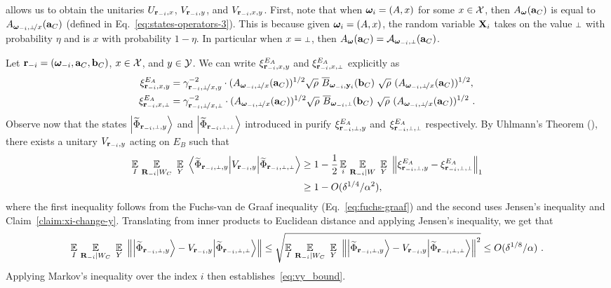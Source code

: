  allows us to obtain the unitaries $U_{\mathbf{r}_{-i},x}$, $V_{\mathbf{r}_{-i},y}$, and $V_{\mathbf{r}_{-i},x,y}$. First, note that when ${\boldsymbol{\omega}}_i = (A,x)$ for some $x \in \mathcal{X}$, then $A_{\boldsymbol{\omega}}(\mathbf{a}_C)$ is equal to $A_{\bomega_\mi,\dummyx}(\ba_C)$ (defined in Eq.~\eqref{eq:states-operators-3}). This is because given ${\boldsymbol{\omega}}_i = (A,x)$, the random variable $\mathbf{X}_i$ takes on the value $\dummy$ with probability $\eta$ and is $x$ with probability $1 - \eta$. In particular when $x = \dummy$, then $A_\bomega(\ba_C) = \A_{\bomega_\mi,\dummy}(\ba_C)$. 

Let $\mathbf{r}_{-i} = ({\boldsymbol{\omega}}_{-i},\mathbf{a}_C,\mathbf{b}_C)$, $x \in \mathcal{X}$, and $y \in \mathcal{Y}$. We can write $\xi^{E_A}_{\mathbf{r}_{-i} , x,y}$ and $\xi^{E_A}_\ssxp$ explicitly as
\begin{align*}
	\xi^{E_A}_\ssxy &= \gamma_\sspxy^{-2} \cdot (A_{\bomega_\mi,\dummyx}(\ba_C))^{1/2} \sqrt{\rho} \,\, \overline{B}_{\bomega_\mi,\by_i}(\bb_C) \,\, \sqrt{\rho}\,\, (A_{\bomega_\mi,\dummyx}(\ba_C))^{1/2},\\ 
	\xi^{E_A}_\ssxp &= \gamma_\sspxp^{-2} \cdot (A_{\bomega_\mi,\dummyx}(\ba_C))^{1/2} \sqrt{\rho} \,\, \overline{B}_{\bomega_\mi,\dummy}(\bb_C) \,\, \sqrt{\rho}\,\, (A_{\bomega_\mi,\dummyx}(\ba_C))^{1/2}~.
\end{align*}
Observe now that the states $\bigket{\wt{\Phi}_\sspy}$ and $\bigket{\wt{\Phi}_\sspp}$ introduced in  purify $\xi^{E_A}_\sspy$ and $\xi^{E_A}_\sspp$ respectively. By Uhlmann's Theorem (), there exists a unitary $V_{\mathbf{r}_{-i}, y}$ acting on $E_B$ such that 
\begin{align}
	\Ex_I \, \Ex_{\bR_\mi |  W_C} \, \, \Ex_{Y} \,\,  \bigbra{\wt{\Phi}_\sspy } V_{\br_\mi, y}  \bigket{\wt{\Phi}_\sspp}  
	& \geq 1 - \frac{1}{2} \Ex_i \, \Ex_{\bR_\mi |  W} \, \, \Ex_{Y}  \,\,  \Big \| \xi^{E_A}_\sspy - \xi^{E_A}_\sspp \Big \|_1 \notag \\
	& \geq 1 - O(\delta^{1/4}/\alpha^2),
\end{align}
where the first inequality follows from the Fuchs-van de Graaf inequality (Eq.~\eqref{eq:fuchs-graaf}) and the second uses Jensen's inequality and Claim~\ref{claim:xi-change-y}. Translating from inner products to Euclidean distance and applying Jensen's inequality, we get that
\[
	\Ex_I \, \Ex_{\bR_\mi |  W_C} \, \, \Ex_{Y} \,\,   \left \| \bigket{\wt{\Phi}_\sspy } - V_{\br_\mi, y}  \bigket{\wt{\Phi}_\sspp}  \right \| \leq \sqrt{\Ex_I \, \Ex_{\bR_\mi |  W_C} \, \, \Ex_{Y} \,\,   \left \| \bigket{\wt{\Phi}_\sspy } - V_{\br_\mi, y}  \bigket{\wt{\Phi}_\sspp}  \right \|^2} \leq O(\delta^{1/8}/\alpha)~.
\]
Applying Markov's inequality over the index $i$ then establishes~\eqref{eq:vy_bound}.


